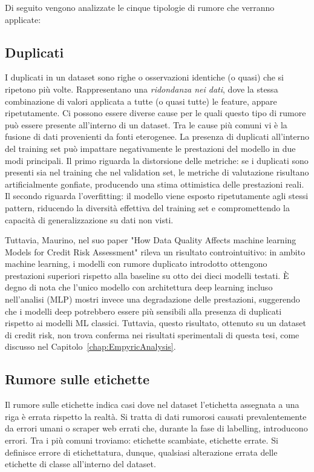\documentclass[../main.tex]{subfiles}
\begin{document}
Di seguito vengono analizzate le cinque tipologie di rumore che verranno applicate:
\subsection{Duplicati}
I duplicati in un dataset sono righe o osservazioni identiche (o quasi) che si ripetono più volte. Rappresentano una \textit{ridondanza nei dati}, dove la stessa combinazione di valori applicata a tutte (o quasi tutte) le feature, appare ripetutamente. Ci possono essere diverse cause per le quali questo tipo di rumore può essere presente all'interno di un dataset. Tra le cause più comuni vi è la fusione di dati provenienti da fonti eterogenee.
La presenza di duplicati all'interno del training set può impattare negativamente le prestazioni del modello in due modi principali. Il primo riguarda la distorsione delle metriche: se i duplicati sono presenti sia nel training che nel validation set, le metriche di valutazione risultano artificialmente gonfiate, producendo una stima ottimistica delle prestazioni reali. Il secondo riguarda l'overfitting: il modello viene esposto ripetutamente agli stessi pattern, riducendo la diversità effettiva del training set e compromettendo la capacità di generalizzazione su dati non visti.

Tuttavia, Maurino, nel suo paper "How Data Quality Affects machine learning Models for Credit Risk Assessment" \cite{maurino2025data} rileva un risultato controintuitivo: in ambito machine learning, i modelli con rumore duplicato introdotto ottengono prestazioni superiori rispetto alla baseline su otto dei dieci modelli testati. È degno di nota che l'unico modello con architettura deep learning incluso nell'analisi (MLP) mostri invece una degradazione delle prestazioni, suggerendo che i modelli deep potrebbero essere più sensibili alla presenza di duplicati rispetto ai modelli ML classici. Tuttavia, questo risultato, ottenuto su un dataset di credit risk, non trova conferma nei risultati sperimentali di questa tesi, come discusso nel Capitolo~\ref{chap:EmpyricAnalysis}.

\subsection{Rumore sulle etichette}
Il rumore sulle etichette indica casi dove nel dataset l'etichetta assegnata a una riga è errata rispetto la realtà. Si tratta di dati rumorosi causati prevalentemente da errori umani \cite{Geiger_2021} o scraper web errati che, durante la fase di labelling, introducono errori. Tra i più comuni troviamo: etichette scambiate, etichette errate. Si definisce errore di etichettatura, dunque, qualsiasi alterazione errata delle etichette di classe all'interno del dataset.
\end{document}
